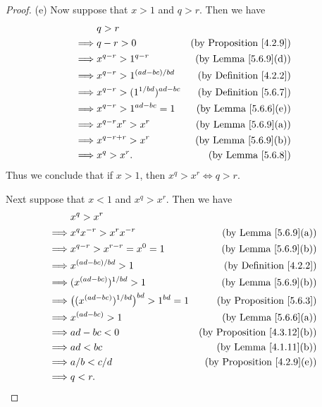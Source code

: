 \begin{proof}{(e)}
    Now suppose that \(x > 1\) and \(q > r\).
    Then we have
    \begin{align*}
                 & q > r                                                                    \\
        \implies & q - r > 0                          & \text{(by Proposition \ref{4.2.9})} \\
        \implies & x^{q - r} > 1^{q - r}              & \text{(by Lemma \ref{5.6.9}(d))}    \\
        \implies & x^{q - r} > 1^{(ad - bc) / bd}     & \text{(by Definition \ref{4.2.2})}  \\
        \implies & x^{q - r} > (1^{1 / bd})^{ad - bc} & \text{(by Definition \ref{5.6.7})}  \\
        \implies & x^{q - r} > 1^{ad - bc} = 1        & \text{(by Lemma \ref{5.6.6}(e))}    \\
        \implies & x^{q - r} x^r > x^r                & \text{(by Lemma \ref{5.6.9}(a))}    \\
        \implies & x^{q - r + r} > x^r                & \text{(by Lemma \ref{5.6.9}(b))}    \\
        \implies & x^q > x^r.                         & \text{(by Lemma \ref{5.6.8})}
    \end{align*}
    Thus we conclude that if \(x > 1\), then \(x^q > x^r \iff q > r\).

    Next suppose that \(x < 1\) and \(x^q > x^r\).
    Then we have
    \begin{align*}
                 & x^q > x^r                                                                                      \\
        \implies & x^q x^{-r} > x^r x^{-r}                              & \text{(by Lemma \ref{5.6.9}(a))}        \\
        \implies & x^{q - r} > x^{r - r} = x^0 = 1                      & \text{(by Lemma \ref{5.6.9}(b))}        \\
        \implies & x^{(ad - bc) / bd} > 1                               & \text{(by Definition \ref{4.2.2})}      \\
        \implies & (x^{(ad - bc)})^{1 / bd} > 1                         & \text{(by Lemma \ref{5.6.9}(b))}        \\
        \implies & \big((x^{(ad - bc)})^{1 / bd}\big)^{bd} > 1^{bd} = 1 & \text{(by Proposition \ref{5.6.3})}     \\
        \implies & x^{(ad - bc)} > 1                                    & \text{(by Lemma \ref{5.6.6}(a))}        \\
        \implies & ad - bc < 0                                          & \text{(by Proposition \ref{4.3.12}(b))} \\
        \implies & ad < bc                                              & \text{(by Lemma \ref{4.1.11}(b))}       \\
        \implies & a / b < c / d                                        & \text{(by Proposition \ref{4.2.9}(e))}  \\
        \implies & q < r.
    \end{align*}


\end{proof}
